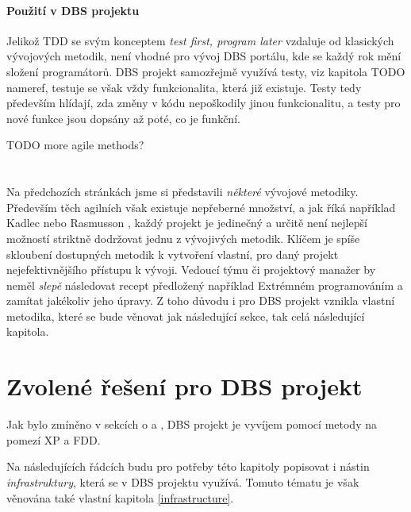 \paragraph{Použití v DBS projektu}
Jelikož TDD se svým konceptem \emph{test first, program later} vzdaluje od klasických vývojových metodik, není vhodné pro vývoj DBS portálu, kde se každý rok mění složení programátorů. DBS projekt samozřejmě využívá testy, viz kapitola TODO nameref, testuje se však vždy funkcionalita, která již existuje. Testy tedy především hlídají, zda změny v kódu nepoškodily jinou funkcionalitu, a testy pro nové funkce jsou dopsány až poté, co je funkční.


TODO more agile methods?
\\
\\
\\
Na předchozích stránkách jsme si představili \emph{některé} vývojové metodiky. Především těch agilních však existuje nepřeberné množství, a jak říká například Kadlec \cite{kadlec} nebo Rasmusson \cite{rasmusson}, každý projekt je jedinečný a určitě není nejlepší možností striktně dodržovat jednu z vývojivých metodik. Klíčem je spíše skloubení dostupných metodik k vytvoření vlastní, pro daný projekt nejefektivnějšího přístupu k vývoji. Vedoucí týmu či projektový manažer by neměl \emph{slepě} následovat recept předložený například Extrémném programováním a zamítat jakékoliv jeho úpravy. Z toho důvodu i pro DBS projekt vznikla vlastní metodika, které se bude věnovat jak následující sekce, tak celá následující kapitola.


\section{Zvolené řešení pro DBS projekt} \label{methods:dbs}

Jak bylo zmíněno v sekcích o \emph{} a \emph{}, DBS projekt je vyvíjem pomocí metody na pomezí XP a FDD.

Na následujících řádcích budu pro potřeby této kapitoly popisovat i nástin \emph{infrastruktury}, která se v DBS projektu využívá. Tomuto tématu je však věnována také vlastní kapitola \ref{infrastructure}.


